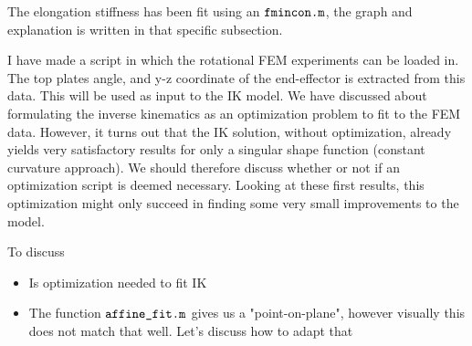 The elongation stiffness has been fit using an $\verb+fmincon.m+$, the graph and explanation is written in that specific subsection.

I have made a script in which the rotational FEM experiments can be loaded in. The top plates angle, and y-z coordinate of the end-effector is extracted from this data. This will be used as input to the IK model. We have discussed about formulating the inverse kinematics as an optimization problem to fit to the FEM data. However, it turns out that the IK solution, without optimization, already yields very satisfactory results for only a singular shape function (constant curvature approach). We should therefore discuss whether or not if an optimization script is deemed necessary. Looking at these first results, this optimization might only succeed in finding some very small improvements to the model.



To discuss

\begin{itemize}
    \item Is optimization needed to fit IK
    \item The function $\verb+affine_fit.m+$ gives us a "point-on-plane", however visually this does not match that well. Let's discuss how to adapt that
\end{itemize}


